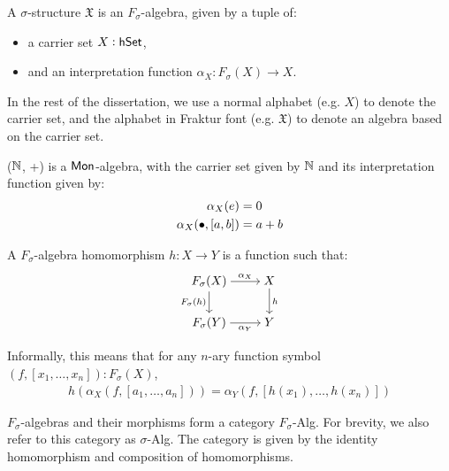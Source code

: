 \begin{definition}\label{algebra:struct}
    A $\sigma$-structure $\mathfrak{X}$ is an $F_\sigma$-algebra, given by a tuple
    of:
    \begin{itemize}
        \item a carrier set $X : \mathsf{hSet}$,
        \item and an interpretation function $\alpha_X : F_\sigma(X) \to X$.
    \end{itemize}
\end{definition}

In the rest of the dissertation, we use a normal alphabet
(e.g. $X$) to denote the carrier set, and the alphabet in Fraktur font
(e.g. $\mathfrak{X}$) to denote an algebra based on the carrier set.

\begin{example}
($\mathbb{N}$, +) is a $\operatorname{\mathsf{Mon}}$-algebra, with
the carrier set given by $\mathbb{N}$ and its interpretation function given by:
\begin{align*}
    \alpha_X(e) & = 0 \\
    \alpha_X(\mathbin{\bullet}, [a, b]) & = a + b
\end{align*}
\end{example}

\begin{definition}
    A $F_\sigma$-algebra homomorphism $h: X \rightarrow Y$ is a function such that:
\[\begin{tikzcd}[ampersand replacement=\&,cramped]
	{F_{\sigma}(X)} \& X \\
	{F_{\sigma}(Y)} \& Y
	\arrow["{\alpha_X}", from=1-1, to=1-2]
	\arrow["{F_{\sigma}(h)}"', from=1-1, to=2-1]
	\arrow["{\alpha_Y}"', from=2-1, to=2-2]
	\arrow["h", from=1-2, to=2-2]
\end{tikzcd}\]
\end{definition}

Informally, this means that for any $n$-ary function symbol $(f, [x_1, \dots, x_n]) : F_{\sigma}(X)$,
\begin{align*}
    h(\alpha_X(f, [a_1, \dots, a_n])) = \alpha_Y(f, [h(x_1), \dots, h(x_n)])
\end{align*}

$F_{\sigma}$-algebras and their morphisms form a category $F_\sigma$-Alg.
For brevity, we also refer to this category as $\sigma$-Alg. The category
is given by the identity homomorphism and composition of homomorphisms.

